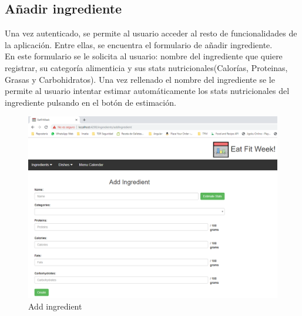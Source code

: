 \documentclass[12pt, a4paper, twoside]{book}
\begin{document}
	\subsection{Añadir ingrediente}
	Una vez autenticado, se permite al usuario acceder al resto de funcionalidades de la aplicación. Entre ellas, se encuentra el formulario de añadir ingrediente.\\
	En este formulario se le solicita al usuario: nombre del ingrediente que quiere registrar, su categoría alimenticia y sus stats nutricionales(Calorías, Proteinas, Grasas y Carbohidratos). Una vez rellenado el nombre del ingrediente se le permite al usuario intentar estimar automáticamente los stats nutricionales del ingrediente pulsando en el botón de estimación.
	\begin{figure}[H]
		\centering
		\includegraphics[width=15cm]{Imagenes/MU-AddIngredient.png}
		\caption{Add ingredient}\label{Add ingredient}
	\end{figure}
\end{document}
